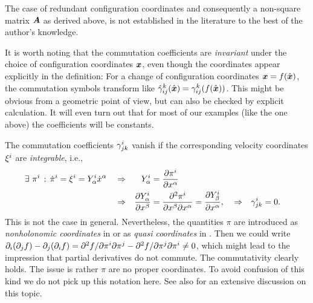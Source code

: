The case of redundant configuration coordinates and consequently a non-square matrix $\kinMat$ as derived above, is not established in the literature to the best of the author's knowledge.

It is worth noting that the commutation coefficients are \textit{invariant} under the choice of configuration coordinates $\sysCoord$, even though the coordinates appear explicitly in the definition:
For a change of configuration coordinates $\sysCoord = f(\sysCoordW)$, the commutation symbols transform like $\BoltzSymW{\LidxIII}{\LidxI}{\LidxII}(\sysCoordW) = \BoltzSym{\LidxIII}{\LidxI}{\LidxII}(f(\sysCoordW))$.
This might be obvious from a geometric point of view, but can also be checked by explicit calculation.
It will even turn out that for most of our examples (like the one above) the coefficients will be constants.

The commutation coefficients $\BoltzSym{\LidxI}{\LidxII}{\LidxIII}$ vanish if the corresponding velocity coordinates $\sysVelCoeff{\LidxI}$ are \textit{integrable}, i.e.,
\begin{align}
 \exists \ \pi^\LidxI \, : \, \dot{\pi}^\LidxI &= \sysVelCoeff{\LidxI} = \kinBasisMatCoeff{\LidxI}{\GidxI} \sysCoordCoeffd{\GidxI}&
 &\Rightarrow&
  \kinBasisMatCoeff{\LidxI}{\GidxI} &= \pdiff[\pi^i]{\sysCoordCoeff{\GidxI}}
\nonumber\\
&&
&\Rightarrow&
 \pdiff[\kinBasisMatCoeff{\LidxI}{\GidxI}]{\sysCoordCoeff{\GidxII}}
 &= \frac{\partial^2 \pi^i}{\partial \sysCoordCoeff{\GidxII} \partial \sysCoordCoeff{\GidxI}}
 = \pdiff[\kinBasisMatCoeff{\LidxI}{\GidxII}]{\sysCoordCoeff{\GidxI}},&
&\Rightarrow&
 \BoltzSym{\LidxI}{\LidxII}{\LidxIII} &= 0.
\end{align}
This is not the case in general.
Nevertheless, the quantities $\pi$ are introduced as \textit{nonholonomic coordinates} in \cite{Boltzmann:NonholCoord} or as \textit{quasi coordinates} in \cite[sec.\,1.5]{Lurie:AnalyticalMechanics}.
Then we could write $\partial_\LidxI (\partial_\LidxII f) - \partial_\LidxII (\partial_\LidxI f) = \sfrac{\partial^2 f}{\partial \pi^\LidxI \partial \pi^\LidxII} - \sfrac{\partial^2 f}{\partial \pi^\LidxII \partial \pi^\LidxI} \neq 0$, which might lead to the impression that partial derivatives do not commute.
The commutativity clearly holds.
The issue is rather $\pi$ are no proper coordinates.
To avoid confusion of this kind we do not pick up this notation here.
See also \cite{Hamel:virtuelleVerschiebungen} for an extensive discussion on this topic.


